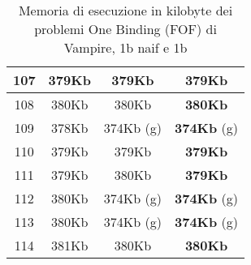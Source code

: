 \begin{table}[H]
\begin{minipage}{5cm}
{\begin{tabular}{|c|c|c|c|}
\hline
107 & 379Kb & 379Kb & \textbf{379Kb} \\
\hline
108 & 380Kb & 380Kb & \textbf{380Kb} \\
\hline
109 & 378Kb & 374Kb (g) & \textbf{374Kb} (g) \\
\hline
110 & 379Kb & 379Kb & \textbf{379Kb} \\
\hline
111 & 379Kb & 380Kb & \textbf{379Kb} \\
\hline
112 & 380Kb & 374Kb (g) & \textbf{374Kb} (g) \\
\hline
113 & 380Kb & 374Kb (g) & \textbf{374Kb} (g) \\
\hline
114 & 381Kb & 380Kb & \textbf{380Kb} \\
\hline
\end{tabular}
}
\end{minipage}
\caption{Memoria di esecuzione in kilobyte dei problemi One Binding (FOF) di Vampire, 1b naif e 1b}
\label{tab:fof_1b_mem}
\end{table}
